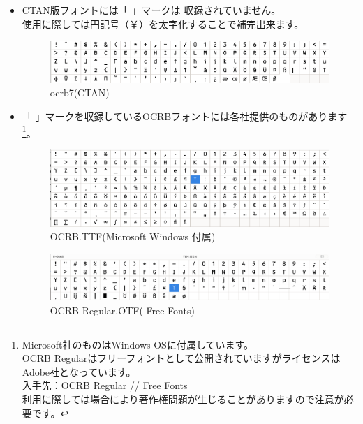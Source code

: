 \documentclass[a4paper,10pt,titlepage,pdfusetitle]{ltjsarticle}
\def\colH#1{\color[HTML]{#1}}
\begin{document}
{\begin{itemize}

  \item CTAN版フォントには「{ }」マークは 収録されていません。\\使用に際しては{\colH{800000}円記号（￥）を太字化}することで補完出来ます。
\vspace{-2mm}
\begin{figure}[H]
\centering
\includegraphics[width=14cm]{./images/ocrb-ttf01.png}
\caption{ocrb7(CTAN)} 
\end{figure}
\vspace{-6mm}

  \item 「{ }」マークを収録しているOCRBフォントには各社提供のものがあります\footnote{Microsoft社のものはWindows OSに付属しています。\\OCRB Regularはフリーフォントとして公開されていますがライセンスはAdobe社となっています。\\入手先：\href{https://freefonts.co/fonts/ocrb-regular}{OCRB Regular // Free Fonts}\\利用に際しては場合により著作権問題が生じることがありますので注意が必要です。}。

\vspace{-2mm}
  
\begin{figure}[H]
\centering
\includegraphics[width=14cm]{./images/ocrb-ttf-ms2.png}
\caption{OCRB.TTF(Microsoft Windows 付属)} 
\end{figure}
\vspace{-6mm}

\begin{figure}[H]
\centering
\includegraphics[width=14cm]{./images/ocrb-regular02.png}
\caption{OCRB Regular.OTF( Free Fonts)} 
\end{figure}


\end{itemize}}
\end{document}
